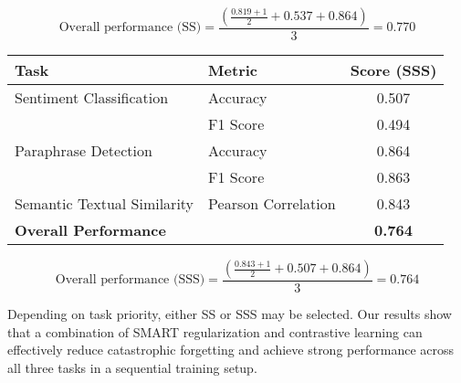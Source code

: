 \documentclass[a4paper, 11pt, oneside]{uet_thesis}  %
\begin{document}
{\[
\text{Overall performance (SS)} = \frac{\left( \frac{0.819 + 1}{2} + 0.537 + 0.864 \right)}{3} = 0.770
\]

\begin{table}[H]
\centering
\begin{tabular}{|l|l|c|}
\hline
\textbf{Task} & \textbf{Metric} & \textbf{Score (SSS)} \\
\hline
Sentiment Classification & Accuracy & 0.507 \\
                         & F1 Score & 0.494 \\
\hline
Paraphrase Detection     & Accuracy & 0.864 \\
                         & F1 Score & 0.863 \\
\hline
Semantic Textual Similarity & Pearson Correlation & 0.843 \\
\hline
\textbf{Overall Performance} &  & \textbf{0.764} \\
\hline
\end{tabular}
\end{table}

\[
\text{Overall performance (SSS)} = \frac{\left( \frac{0.843 + 1}{2} + 0.507 + 0.864 \right)}{3} = 0.764
\]

Depending on task priority, either SS or SSS may be selected. Our results show that a combination of SMART regularization and contrastive learning can effectively reduce catastrophic forgetting and achieve strong performance across all three tasks in a sequential training setup.


}
\clearpage  %

\mainmatter	  %
\pagestyle{fancy}  %
\onehalfspacing



  






\end{document}
